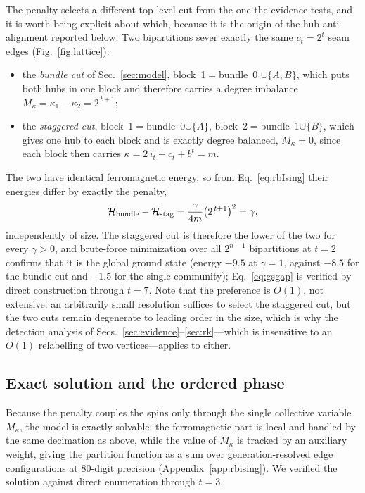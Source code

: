 \documentclass[preprint,12pt]{elsarticle}
\begin{document}
The penalty selects a different top-level cut from the one the evidence tests,
and it is worth being explicit about which, because it is the origin of the
hub anti-alignment reported below. Two bipartitions sever exactly the same
$c_t=2^t$ seam edges (Fig.~\ref{fig:lattice}):
\begin{itemize}
\item the \emph{bundle cut} of Sec.~\ref{sec:model}, block~1$=$bundle~0
      $\cup\{A,B\}$, which puts both hubs in one block and therefore carries a
      degree imbalance $M_\kappa=\kappa_1-\kappa_2=2^{\,t+1}$;
\item the \emph{staggered cut}, block~1$=$bundle~0$\cup\{A\}$,
      block~2$=$bundle~1$\cup\{B\}$, which gives one hub to each block and is
      exactly degree balanced, $M_\kappa=0$, since each block then carries
      $\kappa=2\,i_t+c_t+b^t=m$.
\end{itemize}
The two have identical ferromagnetic energy, so from Eq.~\eqref{eq:rbIsing}
their energies differ by exactly the penalty,
\begin{equation}
  \mathcal{H}_{\rm bundle}-\mathcal{H}_{\rm stag}
  = \frac{\gamma}{4m}\big(2^{\,t+1}\big)^2 = \gamma ,
  \label{eq:gsgap}
\end{equation}
independently of size. The staggered cut is therefore the lower of the two for
every $\gamma>0$, and brute-force minimization over all $2^{n-1}$ bipartitions
at $t=2$ confirms that it is the global ground state (energy $-9.5$ at
$\gamma=1$, against $-8.5$ for the bundle cut and $-1.5$ for the single
community); Eq.~\eqref{eq:gsgap} is verified by direct construction through
$t=7$. Note that the preference is $O(1)$, not extensive: an arbitrarily small
resolution suffices to select the staggered cut, but the two cuts remain
degenerate to leading order in the size, which is why the detection analysis of
Secs.~\ref{sec:evidence}--\ref{sec:rk}---which is insensitive to an $O(1)$
relabelling of two vertices---applies to either.

\subsection{Exact solution and the ordered phase}

Because the penalty couples the spins only through the single collective
variable $M_\kappa$, the model is exactly solvable: the ferromagnetic part is
local and handled by the same decimation as above, while the value of
$M_\kappa$ is tracked by an auxiliary weight, giving the partition function as a
sum over generation-resolved edge configurations at $80$-digit precision
(Appendix~\ref{app:rbising}). We verified the solution against direct
enumeration through $t=3$.
\end{document}
